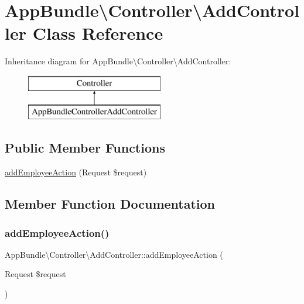 \hypertarget{class_app_bundle_1_1_controller_1_1_add_controller}{}\section{App\+Bundle\textbackslash{}Controller\textbackslash{}Add\+Controller Class Reference}
\label{class_app_bundle_1_1_controller_1_1_add_controller}
Inheritance diagram for App\+Bundle\textbackslash{}Controller\textbackslash{}Add\+Controller\+:\begin{figure}[H]
\begin{center}
\leavevmode
\includegraphics[height=2.000000cm]{class_app_bundle_1_1_controller_1_1_add_controller}
\end{center}
\end{figure}
\subsection*{Public Member Functions}
\begin{DoxyCompactItemize}
\item 
\mbox{\hyperlink{class_app_bundle_1_1_controller_1_1_add_controller_af8ea3325ce33680ab098c54260c63ee8}{add\+Employee\+Action}} (Request \$request)
\end{DoxyCompactItemize}


\subsection{Member Function Documentation}
\mbox{\label{class_app_bundle_1_1_controller_1_1_add_controller_af8ea3325ce33680ab098c54260c63ee8}} 
\subsubsection{\texorpdfstring{add\+Employee\+Action()}{addEmployeeAction()}}
{\footnotesize\ttfamily App\+Bundle\textbackslash{}\+Controller\textbackslash{}\+Add\+Controller\+::add\+Employee\+Action (\begin{DoxyParamCaption}\item[{Request}]{\$request }\end{DoxyParamCaption})}

